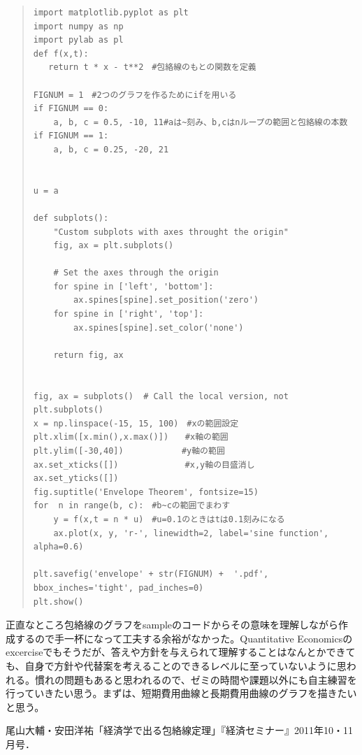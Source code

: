 \documentclass[11pt,a4j,fleqn]{jarticle}
\begin{document}
\begin{quote}
\begin{verbatim}
import matplotlib.pyplot as plt
import numpy as np
import pylab as pl 
def f(x,t):     
   return t * x - t**2　#包絡線のもとの関数を定義

FIGNUM = 1　#2つのグラフを作るためにifを用いる
if FIGNUM == 0:       
    a, b, c = 0.5, -10, 11#aは~刻み、b,cはnループの範囲と包絡線の本数
if FIGNUM == 1:
    a, b, c = 0.25, -20, 21


u = a

def subplots():
    "Custom subplots with axes throught the origin"
    fig, ax = plt.subplots()

    # Set the axes through the origin
    for spine in ['left', 'bottom']:
        ax.spines[spine].set_position('zero')
    for spine in ['right', 'top']:
        ax.spines[spine].set_color('none')
    
    return fig, ax


fig, ax = subplots()  # Call the local version, not plt.subplots()
x = np.linspace(-15, 15, 100)　#xの範囲設定
plt.xlim([x.min(),x.max()])　　#x軸の範囲
plt.ylim([-30,40])　　　　　　　#y軸の範囲
ax.set_xticks([])　　　　　　　　#x,y軸の目盛消し
ax.set_yticks([])
fig.suptitle('Envelope Theorem', fontsize=15)
for  n in range(b, c):　#b~cの範囲でまわす
    y = f(x,t = n * u)　#u=0.1のときはtは0.1刻みになる
    ax.plot(x, y, 'r-', linewidth=2, label='sine function', alpha=0.6)

plt.savefig('envelope' + str(FIGNUM) +  '.pdf', bbox_inches='tight', pad_inches=0)
plt.show()
\end{verbatim}
\end{quote}

正直なところ包絡線のグラフをsampleのコードからその意味を理解しながら作成するので手一杯になって工夫する余裕がなかった。Quantitative Economicsのexcerciseでもそうだが、答えや方針を与えられて理解することはなんとかできても、自身で方針や代替案を考えることのできるレベルに至っていないように思われる。慣れの問題もあると思われるので、ゼミの時間や課題以外にも自主練習を行っていきたい思う。まずは、短期費用曲線と長期費用曲線のグラフを描きたいと思う。



\begin{thebibliography}{0}
尾山大輔・安田洋祐「経済学で出る包絡線定理」『経済セミナー』2011年10・11月号．
\end{thebibliography}
\end{document}
